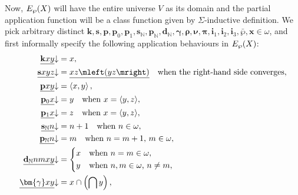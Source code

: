 \documentclass[12pt,openany]{book}
\theoremstyle{plain}
\theoremstyle{definition}
\newcommand\tuple[1]{\left\langle #1 \right\rangle}
\newcommand\bk{\mathbf{k}}
\newcommand\bs{\mathbf{s}}
\newcommand\bp{\mathbf{p}}
\newcommand\bsN{\mathbf{s}_\mathbb{N}}
\newcommand\bpN{\mathbf{p}_\mathbb{N}}
\newcommand\bdN{\mathbf{d}_\mathbb{N}}
\newcommand\bi{\mathbf{i}}
\begin{document}
Now, $E_\wp\mleft(X\mright)$ will have the entire universe $V$ as its domain and the partial application function will be a class function given by $\Sigma$-inductive definition. We pick arbitrary distinct $\bk, \bs, \bp, \bp_0, \bp_1, \bsN, \bpN, \bdN, \bm{\gamma}, \bm{\rho}, \bm{\nu}, \bm{\pi}, \bi_1, \bi_2, \bi_3, \bar{\wp}, \mathbf{x} \in \omega$, and first informally specify the following application behaviours in $E_\wp\mleft(X\mright)$:
\begin{align*}
  \underline{\bk xy} {\downarrow}         & = x,                                                                                                       \\
  \underline{\bs xyz} {\downarrow}        & = \underline{xz\mleft(yz\mright)} \quad \text{when the right-hand side converges},                         \\
  \underline{\bp xy} {\downarrow}         & = \tuple{x, y},                                                                                            \\
  \underline{\bp_0 x} {\downarrow}        & = y \quad \text{when $x = \tuple{y, z}$},                                                                  \\
  \underline{\bp_1 x} {\downarrow}        & = z \quad \text{when $x = \tuple{y, z}$},                                                                  \\
  \underline{\bsN n} {\downarrow}         & = n + 1 \quad \text{when $n \in \omega$},                                                                  \\
  \underline{\bpN n} {\downarrow}         & = m \quad \text{when $n = m + 1$, $m \in \omega$},                                                         \\
  \underline{\bdN nmxy} {\downarrow}      & = \left\{\begin{aligned}
                                                        & x &  & \text{when $n = m \in \omega$},            \\
                                                        & y &  & \text{when $n, m \in \omega$, $n \neq m$},
                                                     \end{aligned}\right.                                              \\
  \underline{\bm{\gamma} xy} {\downarrow} & = x \cap \left(\bigcap y\right),                                                                           \\

\end{align*}
\end{document}
